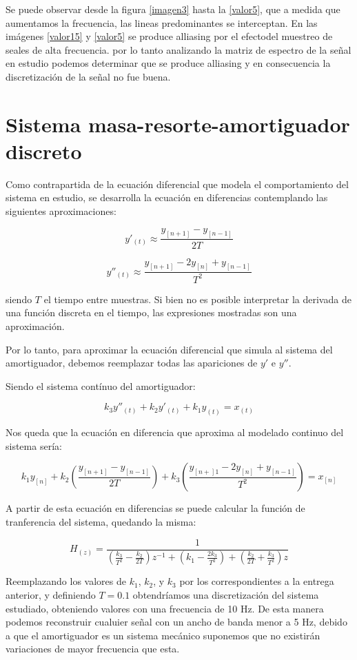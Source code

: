 \documentclass{article}
\begin{document}
	Se puede observar desde la figura \ref{imagen3} hasta la \ref{valor5}, que a medida que aumentamos la frecuencia, las lineas predominantes se interceptan. En las imágenes \ref{valor15} y \ref{valor5} se produce alliasing por el efectodel muestreo de seales de alta frecuencia. por lo tanto analizando la matriz de espectro de la señal en estudio podemos determinar que se produce alliasing y en consecuencia la discretización de la señal no fue buena.

\section{Sistema masa-resorte-amortiguador discreto}

Como contrapartida de la ecuación diferencial que modela el comportamiento del sistema en estudio, se desarrolla la ecuación en diferencias contemplando las siguientes aproximaciones:

$$y'_{(t)} \approx \frac{y_{[n+1]}-y_{[n-1]}}{2T}$$

$$y''_{(t)} \approx \frac{y_{[n+1]} - 2 y_{[n]} + y_{[n-1]}}{T^2}$$

siendo $T$ el tiempo entre muestras. Si bien no es posible interpretar la derivada de una función discreta en el tiempo, las expresiones mostradas son una aproximación.


Por lo tanto, para aproximar la ecuación diferencial que simula al sistema del amortiguador, debemos reemplazar todas las apariciones de $y'$ e $y''$.

Siendo el sistema contínuo del amortiguador:

$$k_3 y''_{(t)} + k_2 y'_{(t)} + k_1 y_{(t)} = x_{(t)}$$

Nos queda que la ecuación en diferencia que aproxima al modelado continuo del sistema sería:

$$k_1 y_{[n]} + k_2 \left(\frac{y_{[n+1]}-y_{[n-1]}}{2T}\right) + k_3 \left(\frac{y_{[n+]1} - 2 y_{[n]} + y_{[n-1]}}{T^2}\right)= x_{[n]}$$

A partir de esta ecuación en diferencias se puede calcular la función de tranferencia del sistema, quedando la misma:

$$H_{(z)} = \frac{1}{\left(\frac{k_3}{T^2} - \frac{k_2}{2T}\right) z^{-1} + \left(k_1-\frac{2k_3}{T^2}\right) + \left(\frac{k_2}{2T} + \frac{k_3}{T^2}\right) z} $$


Reemplazando los valores de $k_1$, $k_2$, y $k_3$ por los correspondientes a la entrega anterior, y definiendo $T=0.1$ obtendríamos una discretización del sistema estudiado, obteniendo valores con una frecuencia de 10 Hz. De esta manera podemos reconstruir cualuier señal con un ancho de banda menor a 5 Hz, debido a que el amortiguador es un sistema mecánico suponemos que  no existirán variaciones de mayor frecuencia que esta.
\end{document}
